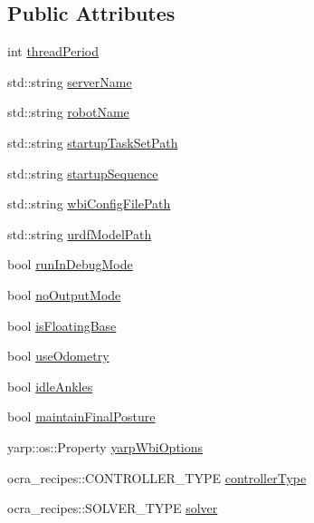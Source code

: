 \subsection*{\-Public \-Attributes}
\begin{DoxyCompactItemize}
\item 
int \hyperlink{classOcraControllerOptions_ab706ae593bf5b30433cfd6f957b51db4}{thread\-Period}
\item 
std\-::string \hyperlink{classOcraControllerOptions_a22380b083fbf0b202993d0415d1d4c83}{server\-Name}
\item 
std\-::string \hyperlink{classOcraControllerOptions_a897948011f23b08ba20e1707033458d4}{robot\-Name}
\item 
std\-::string \hyperlink{classOcraControllerOptions_af91566ecff3f7ed02571369c7af061ce}{startup\-Task\-Set\-Path}
\item 
std\-::string \hyperlink{classOcraControllerOptions_ab01efbd786ad8bc5beb6de02dbcd0936}{startup\-Sequence}
\item 
std\-::string \hyperlink{classOcraControllerOptions_af3a98210531cf667c2838e45b470a66e}{wbi\-Config\-File\-Path}
\item 
std\-::string \hyperlink{classOcraControllerOptions_a697196e6267b2a519dd0bcc2bc03ab73}{urdf\-Model\-Path}
\item 
bool \hyperlink{classOcraControllerOptions_a26dce90c0e6cf7ba608020d01cd08f3c}{run\-In\-Debug\-Mode}
\item 
bool \hyperlink{classOcraControllerOptions_af05db2783f36f469fa535fd4ba5c12b1}{no\-Output\-Mode}
\item 
bool \hyperlink{classOcraControllerOptions_a1edf322553d88c1ac2bf8947e9d942d7}{is\-Floating\-Base}
\item 
bool \hyperlink{classOcraControllerOptions_a335f09b446b6d10e2a8e6eb453391d9e}{use\-Odometry}
\item 
bool \hyperlink{classOcraControllerOptions_a34c0a162302f4f2c462d9ce4818292d5}{idle\-Ankles}
\item 
bool \hyperlink{classOcraControllerOptions_ae7b16a5b8264abd18ee8761eb1091ccf}{maintain\-Final\-Posture}
\item 
yarp\-::os\-::\-Property \hyperlink{classOcraControllerOptions_ac3965bdcce6cb2ce3e4a335f855acd63}{yarp\-Wbi\-Options}
\item 
ocra\-\_\-recipes\-::\-C\-O\-N\-T\-R\-O\-L\-L\-E\-R\-\_\-\-T\-Y\-P\-E \hyperlink{classOcraControllerOptions_aa533fe11c53b7fb17105f1edf48e1c0d}{controller\-Type}
\item 
ocra\-\_\-recipes\-::\-S\-O\-L\-V\-E\-R\-\_\-\-T\-Y\-P\-E \hyperlink{classOcraControllerOptions_af79b8705c3f3097b642262bc877eaa8e}{solver}
\end{DoxyCompactItemize}


